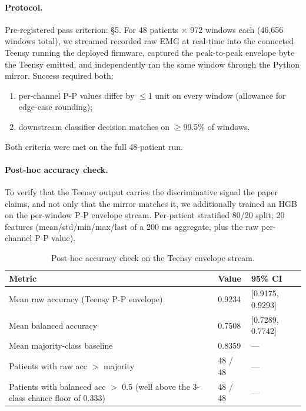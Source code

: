 \documentclass{article}
\begin{document}
\paragraph{Protocol.} Pre-registered pass criterion:  \S 5. For 48 patients $\times$ 972 windows each (46{,}656 windows total), we streamed recorded raw EMG at real-time into the connected Teensy running the deployed firmware, captured the peak-to-peak envelope byte the Teensy emitted, and independently ran the same window through the Python mirror. Success required both:

\begin{enumerate}
  \item per-channel P-P values differ by $\leq$1 unit on every window (allowance for edge-case rounding);
  \item downstream classifier decision matches on $\geq$99.5\% of windows.
\end{enumerate}

Both criteria were met on the full 48-patient run.

\paragraph{Post-hoc accuracy check.} To verify that the Teensy output carries the discriminative signal the paper claims, and not only that the mirror matches it, we additionally trained an HGB on the per-window P-P envelope stream. Per-patient stratified 80/20 split; 20 features (mean/std/min/max/last of a 200 ms aggregate, plus the raw per-channel P-P value).

\begin{table}[h]
  \caption{Post-hoc accuracy check on the Teensy envelope stream.}
  \label{tab:firmware}
  \centering
  \small
  \begin{tabular}{lll}
    \toprule
    Metric & Value & 95\% CI \\
    \midrule
    Mean raw accuracy (Teensy P-P envelope) & 0.9234 & [0.9175, 0.9293] \\
    Mean balanced accuracy & 0.7508 & [0.7289, 0.7742] \\
    Mean majority-class baseline & 0.8359 & --- \\
    Patients with raw acc $>$ majority & 48 / 48 & --- \\
    Patients with balanced acc $>$ 0.5 (well above the 3-class chance floor of 0.333) & 48 / 48 & --- \\
    \bottomrule
  \end{tabular}
\end{table}
\end{document}
